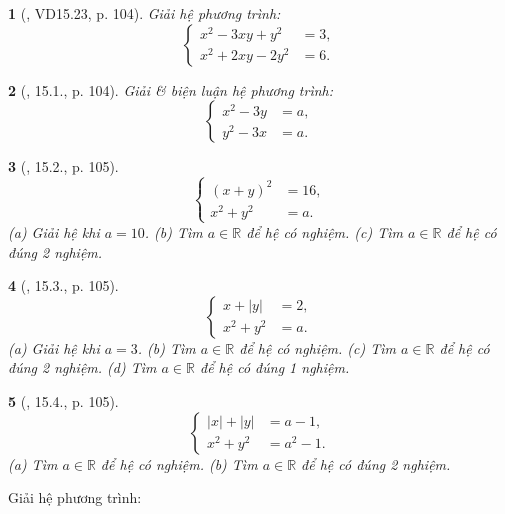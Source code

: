 \documentclass{article}
\newtheorem{baitoan}{}
\begin{document}
\begin{baitoan}[\cite{TLCT_THCS_Toan_9_dai_so}, VD15.23, p. 104]
	Giải hệ phương trình:
	\begin{equation*}
		\left\{\begin{split}
			x^2 - 3xy + y^2 &= 3,\\
			x^2 + 2xy - 2y^2 &= 6.
		\end{split}\right.
	\end{equation*}
\end{baitoan}

\begin{baitoan}[\cite{TLCT_THCS_Toan_9_dai_so}, 15.1., p. 104]
	Giải \& biện luận hệ phương trình:
	\begin{equation*}
		\left\{\begin{split}
			x^2 - 3y &= a,\\
			y^2 - 3x &= a.
		\end{split}\right.
	\end{equation*}
\end{baitoan}

\begin{baitoan}[\cite{TLCT_THCS_Toan_9_dai_so}, 15.2., p. 105]
	\begin{equation*}
		\left\{\begin{split}
			(x + y)^2 &= 16,\\
			x^2 + y^2 &= a.
		\end{split}\right.
	\end{equation*}
	(a) Giải hệ khi $a = 10$. (b) Tìm $a\in\mathbb{R}$ để hệ có nghiệm. (c) Tìm $a\in\mathbb{R}$ để hệ có đúng 2 nghiệm.
\end{baitoan}

\begin{baitoan}[\cite{TLCT_THCS_Toan_9_dai_so}, 15.3., p. 105]
	\begin{equation*}
		\left\{\begin{split}
			x + |y| &= 2,\\
			x^2 + y^2 &= a.
		\end{split}\right.
	\end{equation*}
	(a) Giải hệ khi $a = 3$. (b) Tìm $a\in\mathbb{R}$ để hệ có nghiệm. (c) Tìm $a\in\mathbb{R}$ để hệ có đúng 2 nghiệm. (d) Tìm $a\in\mathbb{R}$ để hệ có đúng 1 nghiệm.
\end{baitoan}

\begin{baitoan}[\cite{TLCT_THCS_Toan_9_dai_so}, 15.4., p. 105]
	\begin{equation*}
		\left\{\begin{split}
			|x| + |y| &= a - 1,\\
			x^2 + y^2 &= a^2 - 1.
		\end{split}\right.
	\end{equation*}
	(a) Tìm $a\in\mathbb{R}$ để hệ có nghiệm. (b) Tìm $a\in\mathbb{R}$ để hệ có đúng 2 nghiệm.
\end{baitoan}
Giải hệ phương trình:
\end{document}
